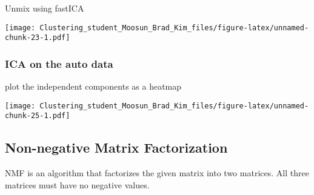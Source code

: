 \documentclass[11pt,]{article}
\newenvironment{Shaded}{\begin{snugshade}}{\end{snugshade}}
\newcommand{\DataTypeTok}[1]{\textcolor[rgb]{0.13,0.29,0.53}{#1}}
\newcommand{\DecValTok}[1]{\textcolor[rgb]{0.00,0.00,0.81}{#1}}
\newcommand{\KeywordTok}[1]{\textcolor[rgb]{0.13,0.29,0.53}{\textbf{#1}}}
\newcommand{\NormalTok}[1]{#1}
\newcommand{\OperatorTok}[1]{\textcolor[rgb]{0.81,0.36,0.00}{\textbf{#1}}}
\newcommand{\StringTok}[1]{\textcolor[rgb]{0.31,0.60,0.02}{#1}}
\begin{document}
Unmix using fastICA

\begin{Shaded}
\end{Shaded}

\texttt{[image: Clustering\_student\_Moosun\_Brad\_Kim\_files/figure-latex/unnamed-chunk-23-1.pdf]}

\hypertarget{ica-on-the-auto-data}{%
\subsubsection{ICA on the auto data}\label{ica-on-the-auto-data}}

plot the independent components as a heatmap

\begin{Shaded}
\end{Shaded}

\texttt{[image: Clustering\_student\_Moosun\_Brad\_Kim\_files/figure-latex/unnamed-chunk-25-1.pdf]}

\newpage

\hypertarget{non-negative-matrix-factorization}{%
\subsection{Non-negative Matrix
Factorization}\label{non-negative-matrix-factorization}}

NMF is an algorithm that factorizes the given matrix into two matrices.
All three matrices must have no negative values.
\end{document}
